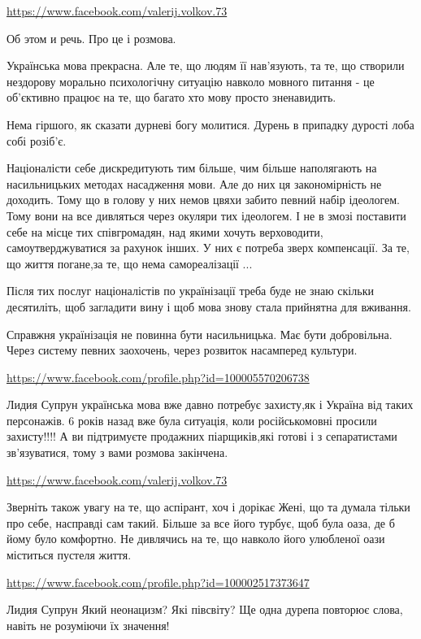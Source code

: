 \documentclass[a4paper,11pt]{extreport}
\begin{document}
\begin{itemize}
\begin{itemize}
\url{https://www.facebook.com/valerij.volkov.73}

Об этом и речь.
Про це і розмова.

Українська мова прекрасна.
Але те, що людям її нав'язують, та те, що створили нездорову морально психологічну ситуацію навколо мовного питання - це об'єктивно працює на те, що багато хто мову просто зненавидить.

Нема гіршого, як сказати дурневі богу молитися. Дурень в припадку дурості лоба собі розіб'є.

Націоналісти себе дискредитують тим більше, чим більше наполягають на насильницьких методах насадження мови. Але до них ця закономірність не доходить. Тому що в голову у них немов цвяхи забито певний набір ідеологем. Тому вони на все дивляться через окуляри тих ідеологем. І не в змозі поставити себе на місце тих співгромадян, над якими хочуть верховодити, самоутверджуватися за рахунок інших. У них є потреба зверх компенсації. За те, що життя погане,за те, що нема самореалізації ...

Після тих послуг націоналістів по українізації треба буде не знаю скільки десятиліть, щоб загладити вину і щоб мова знову стала прийнятна для вживання.

Справжня українізація не повинна бути насильницька. Має бути добровільна. Через систему певних заохочень, через розвиток насамперед культури.

\url{https://www.facebook.com/profile.php?id=100005570206738}

Лидия Супрун українська мова вже давно потребує захисту,як і Україна від таких персонажів. 6 років назад вже була ситуація, коли російськомовні просили захисту!!!! А ви підтримуєте продажних піарщиків,які готові і з сепаратистами зв'язуватися, тому з вами розмова закінчена.

\url{https://www.facebook.com/valerij.volkov.73}

Зверніть також увагу на те, що аспірант, хоч і дорікає Жені, що та думала тільки про себе, насправді сам такий. Більше за все його турбує, щоб була оаза, де б йому було комфортно. Не дивлячись на те, що навколо його улюбленої оази міститься пустеля життя.

\url{https://www.facebook.com/profile.php?id=100002517373647}

Лидия Супрун Який неонацизм? Які півсвіту? Ще одна дурепа повторює слова, навіть не розуміючи їх значення!


\end{itemize}
\end{itemize}
\end{document}
